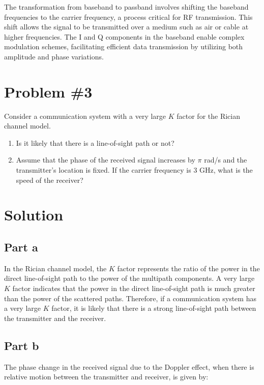 \documentclass[12pt]{article}
\begin{document}
The transformation from baseband to passband involves shifting the baseband frequencies to the carrier frequency, a process critical for RF transmission. This shift allows the signal to be transmitted over a medium such as air or cable at higher frequencies. The I and Q components in the baseband enable complex modulation schemes, facilitating efficient data transmission by utilizing both amplitude and phase variations.

\newpage
\section*{Problem \#3}

Consider a communication system with a very large $K$ factor for the Rician channel model. 

\begin{enumerate}
    \item Is it likely that there is a line-of-sight path or not? 
    \item Assume that the phase of the received signal increases by $\pi$ rad/s and the transmitter’s location is fixed. If the carrier frequency is 3 GHz, what is the speed of the receiver?
\end{enumerate}

\section*{Solution}

\subsection*{Part a}

In the Rician channel model, the $K$ factor represents the ratio of the power in the direct line-of-sight path to the power of the multipath components. A very large $K$ factor indicates that the power in the direct line-of-sight path is much greater than the power of the scattered paths. Therefore, if a communication system has a very large $K$ factor, it is likely that there is a strong line-of-sight path between the transmitter and the receiver.

\subsection*{Part b}

The phase change in the received signal due to the Doppler effect, when there is relative motion between the transmitter and receiver, is given by:
\end{document}
